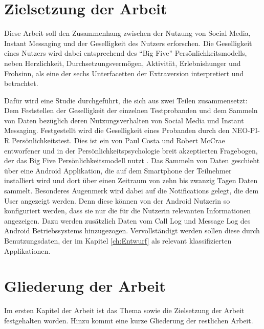 \section{Zielsetzung der Arbeit}
\label{ch:Einleitung:sec:Zielsetzung}

Diese Arbeit soll den Zusammenhang zwischen der Nutzung von Social Media, Instant Messaging und der Geselligkeit des Nutzers erforschen.
Die Geselligkeit eines Nutzers wird dabei entsprechend des "`Big Five"' Persönlichkeitsmodells, neben Herzlichkeit, Durchsetzungsvermögen, Aktivität, Erlebnishunger und Frohsinn, als eine der sechs Unterfacetten der Extraversion interpretiert und betrachtet\cite{john1999big}.


Dafür wird eine Studie durchgeführt, die sich aus zwei Teilen zusammensetzt:
Dem Feststellen der Geselligkeit der einzelnen Testprobanden und dem Sammeln von Daten bezüglich deren Nutzungsverhalten von Social Media und Instant Messaging. 
Festgestellt wird die Geselligkeit eines Probanden durch den NEO-PI-R Persönlichkeitstest.
Dies ist ein von Paul Costa und Robert McCrae entworfener und in der Persönlichkeitspsychologie breit akzeptierten Fragebogen, der das Big Five Persönlichkeitsmodell nutzt \cite{costa1992neo2}.
Das Sammeln von Daten geschieht über eine Android Applikation, die auf dem Smartphone der Teilnehmer installiert wird und dort über einen Zeitraum von zehn bis zwanzig Tagen Daten sammelt.
Besonderes Augenmerk wird dabei auf die Notifications gelegt, die dem User angezeigt werden.
Denn diese können von der Android Nutzerin so konfiguriert werden, dass sie nur die für die Nutzerin relevanten Informationen angezeigen.
Dazu werden zusätzlich Daten vom Call Log und Message Log des Android Betriebssystems hinzugezogen.
Vervollständigt werden sollen diese durch Benutzungsdaten, der im Kapitel \ref{ch:Entwurf} als relevant klassifizierten Applikationen.


\section{Gliederung der Arbeit}
\label{ch:Einleitung:sec:Gliederung}

Im ersten Kapitel der Arbeit ist das Thema sowie die Zielsetzung der Arbeit festgehalten worden.
Hinzu kommt eine kurze Gliederung der restlichen Arbeit.
\par

